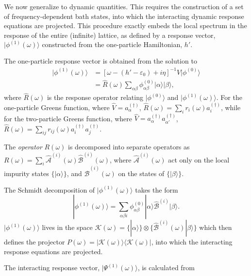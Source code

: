 \documentclass[aps,twocolumn,nobibnotes]{revtex4}
\begin{document}
We now generalize to dynamic quantities. This requires the construction of a set of frequency-dependent bath states, into which the
interacting dynamic response equations are projected. This procedure exactly embeds the local spectrum in the response of the entire (infinite) lattice, 
as defined by a response vector, $|\phi^{(1)}(\omega) \rangle$ constructed from the one-particle Hamiltonian, $h'$.
\begin{inparaenum}
\item The one-particle response vector is obtained from the solution to
\begin{align}
|\phi^{(1)}(\omega) \rangle &= \left[ \omega-(h'-\varepsilon_0)+i\eta \right]^{-1} {\hat V} |\phi^{(0)}\rangle  \nonumber \\ 
                            &= {\hat R}(\omega) \sum_{\alpha \beta} \phi^{(0)}_{\alpha \beta} |\alpha \rangle |\beta \rangle    ,
\end{align}
where ${\hat R}(\omega)$ is the response operator relating $| \phi^{(0)} \rangle$ and $| \phi^{(1)}(\omega) \rangle$. For the one-particle Greens 
function, where ${\hat V} = a_{\alpha}^{(\dagger)}$, ${\hat R}(\omega) = \sum_i r_i(\omega) a_i^{(\dagger)}$, while for the two-particle Greens function, 
where ${\hat V}=a_{\alpha}^{(\dagger)} a_{\alpha'}^{(\dagger)}$, ${\hat R}(\omega) = \sum_{ij} r_{ij}(\omega) a_i^{(\dagger)} a_j^{(\dagger)}$.
\item The {\em operator} $R(\omega)$ is decomposed into separate operators as $R(\omega) = \sum_i {\hat {\mathcal{A}}}^{(i)}(\omega) {\hat {\mathcal{B}}}^{(i)}(\omega)$, 
where ${\hat {\mathcal{A}}}^{(i)}(\omega)$ act only on the local impurity states $\{ |\alpha \rangle \}$, and ${\hat {\mathcal{B}}}^{(i)}(\omega)$ on the states of $\{ |\beta\rangle \}$.
\item The Schmidt decomposition of $| \phi^{(1)}(\omega) \rangle$ takes the form
\begin{equation}
|\phi^{(1)}(\omega) \rangle = \sum_{\alpha \beta i} \phi^{(0)}_{\alpha \beta} |\alpha \rangle {\hat {\mathcal{B}}}^{(i)} |\beta \rangle .
\end{equation}
$| \phi^{(1)}(\omega) \rangle$ lives in the space $\mathcal{K}(\omega) = \{ |\alpha \rangle \} \otimes \{\hat {\mathcal{B}}^{(i)}(\omega) | \beta \rangle \}$ which 
then defines the projector $P(\omega) = |\mathcal{K}(\omega)\rangle \langle \mathcal{K}(\omega) |$, into which the interacting response equations are projected.
\item The interacting response vector, $|\Psi^{(1)} (\omega) \rangle$, is calculated from

\end{inparaenum}
\end{document}

